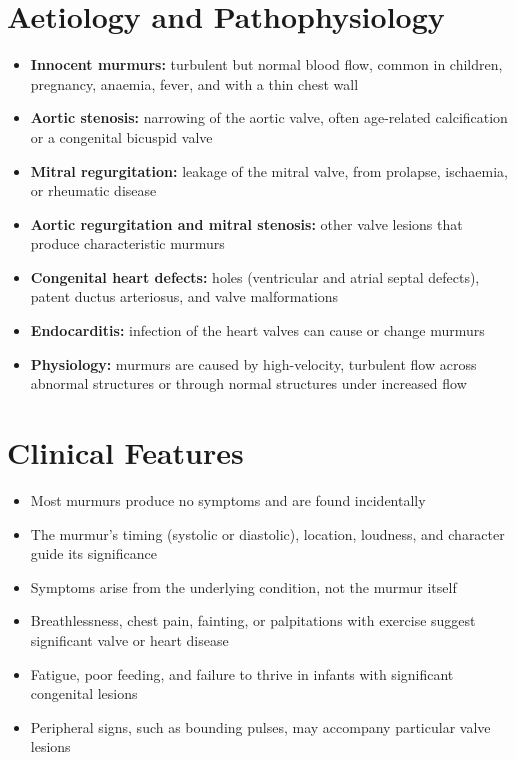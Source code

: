 \section*{Aetiology and Pathophysiology}
\begin{itemize}
    \item \textbf{Innocent murmurs:} turbulent but normal blood flow, common in children, pregnancy, anaemia, fever, and with a thin chest wall
    \item \textbf{Aortic stenosis:} narrowing of the aortic valve, often age-related calcification or a congenital bicuspid valve
    \item \textbf{Mitral regurgitation:} leakage of the mitral valve, from prolapse, ischaemia, or rheumatic disease
    \item \textbf{Aortic regurgitation and mitral stenosis:} other valve lesions that produce characteristic murmurs
    \item \textbf{Congenital heart defects:} holes (ventricular and atrial septal defects), patent ductus arteriosus, and valve malformations
    \item \textbf{Endocarditis:} infection of the heart valves can cause or change murmurs
    \item \textbf{Physiology:} murmurs are caused by high-velocity, turbulent flow across abnormal structures or through normal structures under increased flow
\end{itemize}

\section*{Clinical Features}
\begin{itemize}
    \item Most murmurs produce no symptoms and are found incidentally
    \item The murmur's timing (systolic or diastolic), location, loudness, and character guide its significance
    \item Symptoms arise from the underlying condition, not the murmur itself
    \item Breathlessness, chest pain, fainting, or palpitations with exercise suggest significant valve or heart disease
    \item Fatigue, poor feeding, and failure to thrive in infants with significant congenital lesions
    \item Peripheral signs, such as bounding pulses, may accompany particular valve lesions
\end{itemize}

